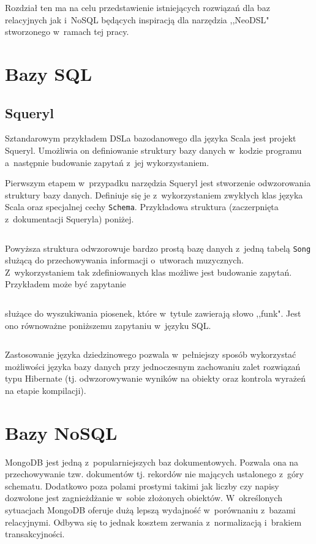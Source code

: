 \documentclass[brudnopis]{xmgr}
\begin{document}
Rozdział ten ma na celu przedstawienie istniejących rozwiązań dla baz relacyjnych jak i~NoSQL będących inspiracją dla narzędzia ,,NeoDSL" stworzonego w~ramach tej pracy.

\section{Bazy SQL}

\subsection{Squeryl}

Sztandarowym przykładem DSLa bazodanowego dla języka Scala jest projekt Squeryl. Umożliwia on definiowanie struktury bazy danych w~kodzie programu a~następnie budowanie zapytań z~jej wykorzystaniem.

Pierwszym etapem w~przypadku narzędzia Squeryl jest stworzenie odwzorowania struktury bazy danych. Definiuje się je z~wykorzystaniem zwykłych klas języka Scala oraz specjalnej cechy \texttt{Schema}. Przykładowa struktura (zaczerpnięta z~dokumentacji Squeryla\cite{squeryl_schemadefinition}) poniżej.

\inputminted{scala}{listings/scala/squeryl-schema.scala}

Powyższa struktura odwzorowuje bardzo prostą bazę danych z~jedną tabelą \texttt{Song} służącą do przechowywania informacji o~utworach muzycznych. Z~wykorzystaniem tak zdefiniowanych klas możliwe jest budowanie zapytań. Przykładem może być zapytanie

\inputminted{scala}{listings/scala/squeryl-query.scala}

\noindent służące do wyszukiwania piosenek, które w~tytule zawierają słowo ,,funk". Jest ono równoważne poniższemu zapytaniu w~języku SQL.

\inputminted{sql}{listings/sql/squeryl-query.sql}

Zastosowanie języka dziedzinowego pozwala w~pełniejszy sposób wykorzystać możliwości języka bazy danych przy jednoczesnym zachowaniu zalet rozwiązań typu Hibernate (tj. odwzorowywanie wyników na obiekty oraz kontrola wyrażeń na etapie kompilacji).

\section{Bazy NoSQL}

MongoDB jest jedną z~popularniejszych baz dokumentowych. Pozwala ona na przechowywanie tzw. dokumentów tj. rekordów nie mających ustalonego z~góry schematu. Dodatkowo poza polami prostymi takimi jak liczby czy napisy dozwolone jest zagnieżdżanie w~sobie złożonych obiektów. W~określonych sytuacjach MongoDB oferuje dużą lepszą wydajność w~porównaniu z~bazami relacyjnymi. Odbywa się to jednak kosztem zerwania z~normalizacją i~brakiem transakcyjności.
\end{document}
